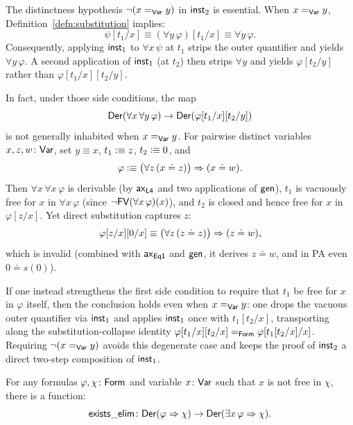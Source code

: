 \begin{rem}\label{rem:inst2-distinct}
    The distinctness hypothesis $\neg(x\mathrel{=_{\mathsf{Var}}}y)$ in $\mathsf{inst}_2$ is essential. When $x\mathrel{=_{\mathsf{Var}}}y$, Definition~\ref{defn:substitution} implies:
    \[
        \psi[t_1/x]
        \equiv(\forall y\,\varphi)[t_1/x]
        \equiv\forall y\,\varphi.
    \]
    Consequently, applying $\mathsf{inst}_1$ to $\forall x\,\psi$ at $t_1$ strips the outer quantifier and yields $\forall y\,\varphi$. A second application of $\mathsf{inst}_1$ (at $t_2$) then strips $\forall y$ and yields $\varphi[t_2/y]$ rather than $\varphi[t_1/x][t_2/y]$.
    
    In fact, under those side conditions, the map
    \[
        \mathsf{Der}(\forall x\,\forall y\,\varphi)
        \to
        \mathsf{Der}(\varphi[t_1/x][t_2/y])
    \]
    is not generally inhabited when $x\mathrel{=_{\mathsf{Var}}}y$. For pairwise distinct variables $x,z,w\colon\fun{Var}$, set $y\equiv x$, $t_1\mathrel{\vcentcolon}\equiv z$, $t_2\mathrel{\vcentcolon}\equiv 0$, and
    \[
        \varphi\mathrel{\vcentcolon}\equiv\bigl(\forall z\,(x\doteq z)\bigr)\mathrel{\Rightarrow}(x\doteq w).
    \]
    Then $\forall x\,\forall x\,\varphi$ is derivable (by $\mathsf{ax}_{\mathsf{L4}}$ and two applications of $\mathsf{gen}$), $t_1$ is vacuously free for $x$ in $\forall x\,\varphi$ (since $\neg\mathsf{FV}(\forall x\,\varphi)(x)$), and $t_2$ is closed and hence free for $x$ in $\varphi[z/x]$. Yet direct substitution captures $z$:
    \[
        \varphi[z/x][0/x]
        \equiv\bigl(\forall z\,(z\doteq z)\bigr)\mathrel{\Rightarrow}(z\doteq w),
    \]
    which is invalid (combined with $\mathsf{ax}_{\mathsf{Eq1}}$ and $\mathsf{gen}$, it derives $z\doteq w$, and in PA even $0\doteq s(0)$).

    If one instead strengthens the first side condition to require that $t_1$ be free for $x$ in $\varphi$ itself, then the conclusion holds even when $x\mathrel{=_{\mathsf{Var}}}y$: one drops the vacuous outer quantifier via $\mathsf{inst}_1$ and applies $\mathsf{inst}_1$ once with $t_1[t_2/x]$, transporting along the substitution-collapse identity $\varphi[t_1/x][t_2/x]\mathrel{=_{\mathsf{Form}}}\varphi[t_1[t_2/x]/x]$. Requiring $\neg(x\mathrel{=_{\mathsf{Var}}}y)$ avoids this degenerate case and keeps the proof of $\mathsf{inst}_2$ a direct two-step composition of $\mathsf{inst}_1$.
\end{rem}

\begin{lem}
    \label{lem:existential-elimination}
    For any formulas\/ $\varphi,\chi\colon\fun{Form}$ and variable\/ $x\colon\fun{Var}$ such that\/ $x$ is not free in\/ $\chi$, there is a function:
    \[
        \fun{exists\_elim}\colon\fun{Der}(
            \varphi\imp\chi
        )
        \to
        \fun{Der}(\exists x\,\varphi\imp\chi).
    \]
\end{lem}

